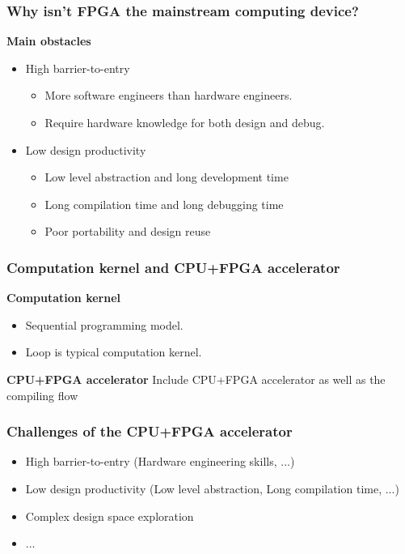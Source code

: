 \documentclass{beamer}
\begin{document}
\begin{frame}[t]

\frametitle{Why isn't FPGA the mainstream computing device?}
\textbf{Main obstacles}
\begin{itemize}
\item High barrier-to-entry
\begin{itemize}
\item More software engineers than hardware engineers.
\item Require hardware knowledge for both design and debug.
\end{itemize}

\item Low design productivity
\begin{itemize}
\item Low level abstraction and long development time
\item Long compilation time and long debugging time
\item Poor portability and design reuse
\end{itemize}

\end{itemize}
\end{frame}

\begin{frame}[t]
\frametitle{Computation kernel and CPU+FPGA accelerator}
\textbf{Computation kernel}
\begin{itemize}
\item Sequential programming model.
\item Loop is typical computation kernel.
\end{itemize}

\textbf{CPU+FPGA accelerator}
Include CPU+FPGA accelerator as well as the compiling flow

\end{frame}

\begin{frame}[t]
\frametitle{Challenges of the CPU+FPGA accelerator}
\begin{itemize}
\item High barrier-to-entry (Hardware engineering skills, ...)
\item Low design productivity (Low level abstraction, Long compilation time, ...)
\item Complex design space exploration
\item ...
\end{itemize}
\end{frame}
\end{document}
